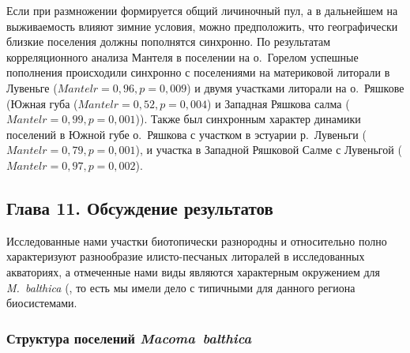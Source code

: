 {{Если при размножении формируется общий личиночный пул, а в дальнейшем на выживаемость влияют зимние условия, можно предположить, что географически близкие поселения должны пополнятся синхронно.
По результатам корреляционного анализа Мантеля в поселении на о.~Горелом успешные пополнения происходили синхронно с поселениями на материковой литорали в Лувеньге ($Mantel r = 0,96, p = 0,009$) и двумя участками литорали на о.~Ряшкове (Южная губа ($Mantel r = 0,52, p = 0,004$) и Западная Ряшкова салма ($Mantel r = 0,99, p = 0,001$)).
Также был синхронным характер динамики поселений в Южной губе о.~Ряшкова с участком в эстуарии р.~Лувеньги ($Mantel r = 0,79, p = 0,001$), и участка в Западной Ряшковой Салме с Лувеньгой ($Mantel r = 0,97, p = 0,002$).

\subsection*{Глава 11. Обсуждение результатов}
Исследованные нами участки биотопически разнородны и относительно полно характеризуют разнообразие илисто-песчаных литоралей в исследованных акваториях, а отмеченные нами виды являются характерным окружением для \textit{M.~balthica} (\cite{Derugin_1915, Guryanova_et_al_1928, Guryanova_Ushakov_1929, Guryanova_et_al_1930,Babkov_Golikov_1984, Naumov_Fedyakov_1993, Chertoprud_et_al_2004, Naumov_2006, Gerasimova_et_al_2010, Derevenschikov_Kravets_2010, Stolyarov_2010}, то есть мы имели дело с типичными для данного региона биосистемами.

\subsubsection*{Структура поселений \textit{Macoma~balthica}}
}}

